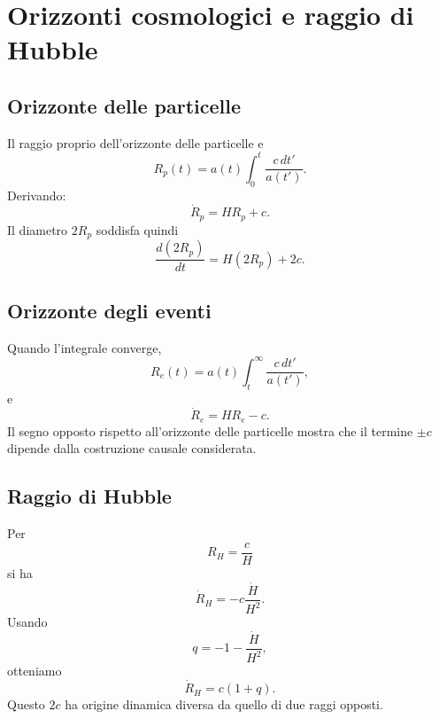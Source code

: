 \documentclass[11pt,a4paper]{article}
\begin{document}
\section{Orizzonti cosmologici e raggio di Hubble}

\subsection{Orizzonte delle particelle}

Il raggio proprio dell'orizzonte delle particelle e
\begin{equation}
 R_p(t)=a(t)\int_0^t\frac{c\,dt'}{a(t')}.
 \label{eq:particle_horizon}
\end{equation}
Derivando:
\begin{equation}
 \boxed{\dot R_p=HR_p+c.}
 \label{eq:particle_dot}
\end{equation}
Il diametro $2R_p$ soddisfa quindi
\begin{equation}
 \frac{d(2R_p)}{dt}=H(2R_p)+2c.
\end{equation}

\subsection{Orizzonte degli eventi}

Quando l'integrale converge,
\begin{equation}
 R_e(t)=a(t)\int_t^{\infty}\frac{c\,dt'}{a(t')},
\end{equation}
e
\begin{equation}
 \boxed{\dot R_e=HR_e-c.}
\end{equation}
Il segno opposto rispetto all'orizzonte delle particelle mostra che il termine $\pm c$ dipende dalla costruzione causale considerata.

\subsection{Raggio di Hubble}

Per
\begin{equation}
 R_H=\frac{c}{H}
\end{equation}
si ha
\begin{equation}
 \dot R_H=-c\frac{\dot H}{H^2}.
\end{equation}
Usando
\begin{equation}
 q=-1-\frac{\dot H}{H^2},
\end{equation}
otteniamo
\begin{equation}
 \boxed{\dot R_H=c(1+q).}
 \label{eq:hubble_radius_dot}
\end{equation}
Questo $2c$ ha origine dinamica diversa da quello di due raggi opposti.
\end{document}
